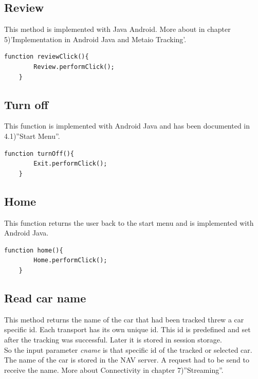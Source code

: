 \subsection{Review}
This method is implemented with Java Android. More about in chapter 5)'Implementation in Android Java and Metaio Tracking'.
\\

\begin{lstlisting}[language=html, caption= 
Review function,captionpos=b]
function reviewClick(){
        Review.performClick();
    }
\end{lstlisting}

\subsection{Turn off}
This function is implemented with Android Java and has been documented in 4.1)''Start Menu''.
\\

\begin{lstlisting}[language=html, caption= 
Turn off funtion,captionpos=b]
function turnOff(){
        Exit.performClick();
    }
\end{lstlisting}


\subsection{Home}
This function returns the user back to the start menu and is implemented with Android Java.\\

\begin{lstlisting}[language=html, caption= 
Home function,captionpos=b]
function home(){
        Home.performClick();
    }
\end{lstlisting}


\subsection{Read car name}
This method returns the name of the car that had been tracked threw a car specific id. Each transport has its own unique id. This id is predefined and set after the tracking was successful. Later it is stored in session storage.
\\
\newline  
So the input parameter \textit{cname} is that specific id of the tracked or selected car. The name of the car is stored in the NAV server. A request had to be send to receive the name. More about Connectivity in chapter 7)''Streaming''.
\\

